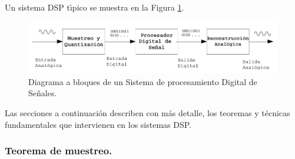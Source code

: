 \begin{doublespace}
Un sistema DSP t\'{\i}pico se muestra en la Figura \ref{fig:Diagrama-a-bloques}.
\end{doublespace}

\begin{figure}[H]
\begin{centering}
\includegraphics[scale=0.4]{img/fullblocks}
\par\end{centering}
\caption{Diagrama a bloques de un Sistema de procesamiento Digital de Se\~{n}ales.\label{fig:Diagrama-a-bloques}}

\end{figure}

Las secciones a continuaci\'{o}n describen con m\'{a}s detalle, los
teoremas y t\'{e}cnicas fundamentales que intervienen en los sistemas
DSP.

\subsubsection{Teorema de muestreo.}

